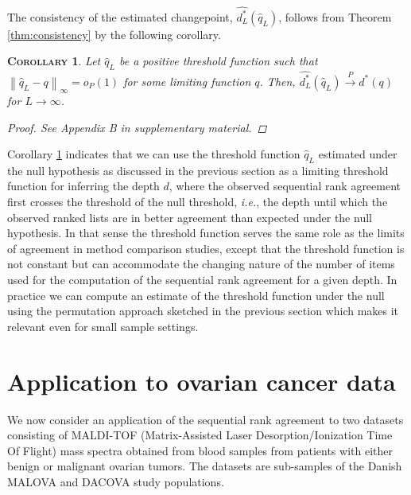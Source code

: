 \documentclass[oupdraft]{bio}
\makeatletter
\newcommand{\ie}{\emph{i.e.}\@\xspace}
\newtheorem{corollary}{\normalfont\scshape Corollary}[section]
\makeatother
\begin{document}
The consistency of the estimated changepoint, $\widehat{d^\ast_L}(\widehat{q}_L)$, follows from Theorem \ref{thm:consistency} by the following corollary. 
\begin{corollary}\label{thecor}
Let $\widehat{q}_L$ be a positive threshold function such that $\left\|\widehat{q}_L - q\right\|_\infty = o_P(1)$ for some limiting
function $q$.  Then, $\widehat{d^\ast_L}(\widehat{q}_L) \overset{P}{\longrightarrow} d^\ast(q)$ for $L \rightarrow \infty$.
\label{cor:consistency}
\begin{proof}
See Appendix B in supplementary material.%
\end{proof}
\end{corollary}


Corollary \ref{thecor} indicates that we can use the threshold
function $\widehat{q}_L$ estimated under the null hypothesis as
discussed in the previous section as a limiting threshold function for
inferring the depth $d$, where the observed sequential rank agreement
first crosses the threshold of the null threshold, \ie, the depth
until which the observed ranked lists are in better agreement than
expected under the null hypothesis. In that sense the threshold
function serves the same role as the limits of agreement in method
comparison studies, except that the threshold function is not constant
but can accommodate the changing nature of the number of items used
for the computation of the sequential rank agreement for a given depth.
%
In practice we can compute an estimate of the threshold function under
the null using the permutation approach sketched in the previous
section which makes it relevant even for small sample settings.


\section{Application to ovarian cancer data}
We now consider an application of the sequential rank agreement to two
datasets consisting of MALDI-TOF (Matrix-Assisted Laser
Desorption/Ionization Time Of Flight) mass spectra obtained from blood
samples from patients with either benign or malignant ovarian
tumors. The datasets are sub-samples of the Danish MALOVA and DACOVA
study populations.
\end{document}
